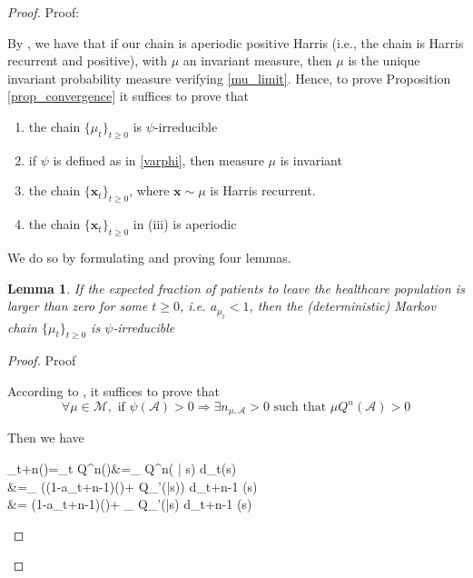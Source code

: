 \documentclass[12pt,a4paper]{article}
\newtheorem{lemma}{Lemma}
\newcommand{\bx}{\mathbf{x}}
\begin{document}
	
	
        \begin{proof}{Proof:}
            
     
		
		By  \cite[Theorem 13.0.1]{stochastic-stability}, we have that if our chain is aperiodic positive Harris (i.e., the chain is Harris recurrent and positive), with $\mu$ an invariant measure, then $\mu$ is the unique invariant probability measure verifying \eqref{mu_limit}. Hence, to prove Proposition \ref{prop_convergence} it suffices to prove that
		
		\begin{enumerate}
			\item[(i)] the chain $\{\mu_t\}_{t\geq0}$  is $\psi$-irreducible
			\item[(ii)] if $\psi$ is defined as in \eqref{varphi}, then measure $\mu$ is invariant
			\item[(iii)] the chain $\{\bx_t\}_{t\geq0}$, where $\bx \sim \mu$ is Harris recurrent.
			\item[(iv)] the chain $\{\bx_t\}_{t\geq0}$ in (iii) is aperiodic
		\end{enumerate}
		
		\noindent We do so by formulating and proving four lemmas.
		
		\begin{lemma}\label{lemma_irreducible}
			If the expected fraction of patients to leave the healthcare population is larger than zero for some $t\geq 0$, i.e. $a_{\mu_t}<1$, then the (deterministic) Markov chain $\{\mu_t\}_{t\geq0}$  is $\psi$-irreducible
		\end{lemma}
		
		\begin{proof} {Proof}
			
			According to  \cite[Proposition 4.2.1]{stochastic-stability}, it suffices to prove that 
			\begin{equation}
				\forall \mu \in \mathcal{M}, \mbox{ if } \psi(\mathcal{A})>0 \Rightarrow \exists n_{\mu,\mathcal{A}}>0 \mbox{ such that } \mu Q^n(\mathcal{A})>0
			\end{equation}
			
			Then we have
			
			\begin{flalign} \label{transition_mu}
				\mu_{t+n}(\mathcal{A})=\mu_t Q^n()&=\int_{} Q^n( | s) d\mu_t(s) \nonumber\\
				&=\int_{} ((1-a_{t+n-1})\psi()+  Q_{\bx'}(|s)) d\mu_{t+n-1} (s) \nonumber\\
				&= (1-a_{t+n-1})\psi()+  \int_{} Q_{\bx'}(|s) d\mu_{t+n-1} (s) \nonumber
			\end{flalign}
			

\end{proof}
\end{proof}
\end{document}
